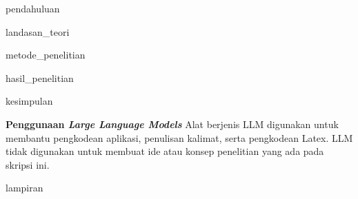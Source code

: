 \documentclass[oneside, 12pt, a4paper]{book}
\numberwithin{equation}{chapter}
\numberwithin{algorithm}{chapter}
\begin{document}
\clearpage
\listoftables

\clearpage
\listoffigures

\clearpage
\listofmyalgorithms

\clearpage
\listofmyequations

\clearpage
{}
{}
\printglossary[type=\acronymtype,title=Daftar Singkatan]

\clearpage
{}
{}
\listofmylampiran

\renewcommand{\thechapter}{\Roman{chapter}} %


\mainmatter
\justifying



\begin{doublespace}


\clearpage
{pendahuluan}

\clearpage
{landasan_teori}

\clearpage
{metode_penelitian}

\clearpage
{hasil_penelitian}

\clearpage
{kesimpulan}



%
%
%
%
%
%


\end{doublespace}

\backmatter
\clearpage
\printbibliography[
	heading=bibintoc, 
	title=DAFTAR PUSTAKA
]

\clearpage
\textbf{Penggunaan \textit{Large Language Models}} Alat berjenis LLM digunakan untuk membantu pengkodean
aplikasi, penulisan kalimat, serta pengkodean Latex.
LLM tidak digunakan untuk membuat ide atau konsep penelitian yang ada pada skripsi ini.

\appendix
\clearpage
{lampiran}

\clearpage
\end{document}
